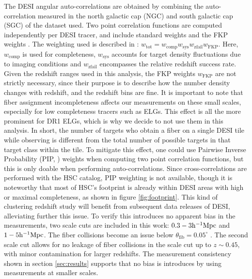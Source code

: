 The DESI angular auto-correlations are obtained by combining the auto-correlation measured in the north galactic cap (NGC) and south galactic cap (SGC) of the dataset used. Two point correlation functions are computed independently per DESI tracer, and include standard weights and the FKP weights \cite{FKPWeights1994}. 
The weighting used is described in \cite{DESIConstructionLSS2024}: $w_\mathrm{tot}=w_\mathrm{comp}w_\mathrm{sys}w_\mathrm{zfail}w_\mathrm{FKP}$. Here, $w_\mathrm{comp}$ is used for completeness, $w_\mathrm{sys}$ accounts for target density fluctuations due to imaging conditions and $w_\mathrm{zfail}$ encompasses the relative redshift success rate. Given the redshift ranges used in this analysis, the FKP weights $w_{\mathrm{FKP}}$ are not strictly necessary, since their purpose is to describe how the number density changes with redshift, and the redshift bins are fine. It is important to note that fiber assignment incompleteness affects our measurements on these small scales, especially for low completeness tracers such as ELGs. 
This effect is all the more prominent for DR1 ELGs, which is why we decide to not use them in this analysis. 
In short, the number of targets who obtain a fiber on a single DESI tile while observing is different from the total number of possible targets in that target class within the tile. 
To mitigate this effect, one could use Pairwise Inverse Probability (PIP, \cite{BianchiPIP2017}) weights when computing two point correlation functions, but this is only doable when performing auto-correlations.
Since cross-correlations are performed with the HSC catalog, PIP weighting is not available, though it is noteworthy that most of HSC's footprint is already within DESI areas with high or maximal completeness, as shown in figure \ref{fig:footprint}. 
This kind of clustering redshift study will benefit from subsequent data releases of DESI, alleviating further this issue. 
To verify this introduces no apparent bias in the measurements, two scale cuts are included in this work: $0.3-3\mathrm{h}^{-1}\mathrm{Mpc}$ and $1-5\mathrm{h}^{-1}\mathrm{Mpc}$. 
The fiber collisions become an issue below $\theta_\mathrm{fib}=0.05^\circ$ \cite{bianchi2025characterizationdesifiberassignment, Pinon2025FiberAssign}. 
The second scale cut allows for no leakage of fiber collisions in the scale cut up to $z\sim0.45$, with minor contamination for larger redshifts. 
The measurement consistency shown in section \ref{sec:results} supports that no bias is introduces by using measurements at smaller scales.

